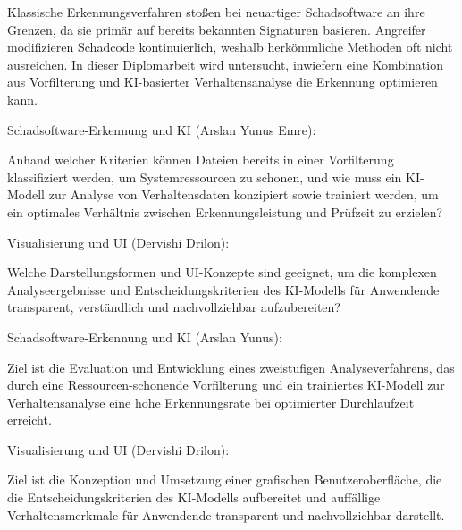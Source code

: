 \abschnittsautor{\alleautoren}


Klassische Erkennungsverfahren stoßen bei neuartiger Schadsoftware an ihre Grenzen, da sie primär auf bereits bekannten Signaturen basieren. Angreifer modifizieren Schadcode kontinuierlich, weshalb herkömmliche Methoden oft nicht ausreichen. In dieser Diplomarbeit wird untersucht, inwiefern eine Kombination aus Vorfilterung und KI-basierter Verhaltensanalyse die Erkennung optimieren kann.



Schadsoftware-Erkennung und KI (Arslan Yunus Emre):

Anhand welcher Kriterien können Dateien bereits in einer Vorfilterung klassifiziert werden, um Systemressourcen zu schonen, und wie muss ein KI-Modell zur Analyse von Verhaltensdaten konzipiert sowie trainiert werden, um ein optimales Verhältnis zwischen Erkennungsleistung und Prüfzeit zu erzielen?


Visualisierung und UI (Dervishi Drilon):

Welche Darstellungsformen und UI-Konzepte sind geeignet, um die komplexen Analyseergebnisse und Entscheidungskriterien des KI-Modells für Anwendende transparent, verständlich und nachvollziehbar aufzubereiten?


Schadsoftware-Erkennung und KI (Arslan Yunus):

Ziel ist die Evaluation und Entwicklung eines zweistufigen Analyseverfahrens, das durch eine Ressourcen-schonende Vorfilterung und ein trainiertes KI-Modell zur Verhaltensanalyse eine hohe Erkennungsrate bei optimierter Durchlaufzeit erreicht.

Visualisierung und UI (Dervishi Drilon):

Ziel ist die Konzeption und Umsetzung einer grafischen Benutzeroberfläche, die die Entscheidungskriterien des KI-Modells aufbereitet und auffällige Verhaltensmerkmale für Anwendende transparent und nachvollziehbar darstellt.   

